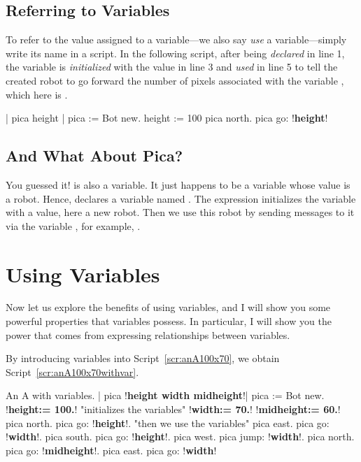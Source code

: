 \documentclass[a4paper,10pt,twoside]{book}
\begin{document}
\subsection{Referring to Variables} 

To refer to the value assigned to a variable---we also say \emph{use} a variable---simply write its name 
in a script. In the following script, after being \emph{declared} in line 1, the variable  is \emph{initialized} with the value  in line 3 and \emph{used} in line 5 to tell the created robot to go forward the number of pixels associated with the variable , which here is . 

\begin{code}{}
| pica height | 
pica := Bot new. 
height := 100 
pica north. 
pica go: !\textbf{height}!
\end{code}


\subsection{And What About Pica?} 

You guessed it!  is also a variable. It just happens to be a variable whose value is a robot. Hence,  declares a variable named . The expression  initializes the variable with a value, here a new robot. Then we use this robot by sending messages to it via the variable , for example, . 

\section{Using Variables} 

Now let us explore the benefits of using variables, and I will show you some powerful properties that variables possess. In particular, I will show you the power that comes from expressing relationships between variables. 

By introducing variables into Script~\ref{scr:anA100x70}, we obtain Script~\ref{scr:anA100x70withvar}. 


\begin{script}{An A with variables.}
| pica !\textbf{height width midheight}!| 
pica := Bot new. 
!\textbf{height:= 100.}!              "initializes the variables" 
!\textbf{width:= 70.}! 
!\textbf{midheight:= 60.}! 
pica north. 
pica go: !\textbf{height}!.            "then we use the variables" 
pica east. 
pica go: !\textbf{width}!. 
pica south. 
pica go: !\textbf{height}!. 
pica west. 
pica jump: !\textbf{width}!. 
pica north. 
pica go: !\textbf{midheight}!. 
pica east. 
pica go: !\textbf{width}! 
\end{script}
\end{document}

